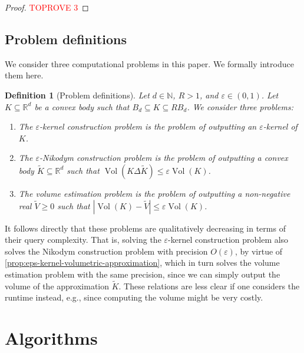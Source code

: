 \documentclass[11pt]{article}
\newtheorem{definition}[theorem]{Definition}
\newcommand{\N}{\ensuremath{\mathbb{N}}}
\newcommand{\R}{\ensuremath{\mathbb{R}}}
\DeclareMathOperator{\Vol}{Vol}
\begin{document}
    \begin{proof}\textcolor{red}{TOPROVE 3}\end{proof}

    \subsection{Problem definitions}

    We consider three computational problems in this paper. We formally introduce them here.

    \begin{definition}[Problem definitions]
        \label{def:problems}
        Let $d \in \N$, $R > 1$, and $\varepsilon \in (0,1)$. Let $K \subseteq \R^d$ be a convex body such that $B_d \subseteq K \subseteq RB_d$. We consider three problems:
        \begin{enumerate}[nosep]
            \item The \emph{$\varepsilon$-kernel construction problem} is the problem of outputting an $\varepsilon$-kernel of $K$.
            \item The \emph{$\varepsilon$-Nikodym construction problem} is the problem of outputting a convex body $\widetilde{K} \subseteq \R^d$ such that $\Vol(K \Delta \widetilde{K}) \leq \varepsilon\Vol(K)$.
            \item The \emph{volume estimation problem} is the problem of outputting a non-negative real $\widetilde{V} \geq 0$ such that $|\Vol(K) - \widetilde{V}| \leq \varepsilon\Vol(K)$.
        \end{enumerate}
    \end{definition}

    It follows directly that these problems are qualitatively decreasing in terms of their query complexity. That is, solving the $\varepsilon$-kernel construction problem also solves the Nikodym construction problem with precision $O(\varepsilon)$, by virtue of \cref{prop:eps-kernel-volumetric-approximation}, which in turn solves the volume estimation problem with the same precision, since we can simply output the volume of the approximation $\widetilde{K}$. These relations are less clear if one considers the runtime instead, e.g., since computing the volume might be very costly.

    \section{Algorithms}
    \label{sec:algorithms}
\end{document}
